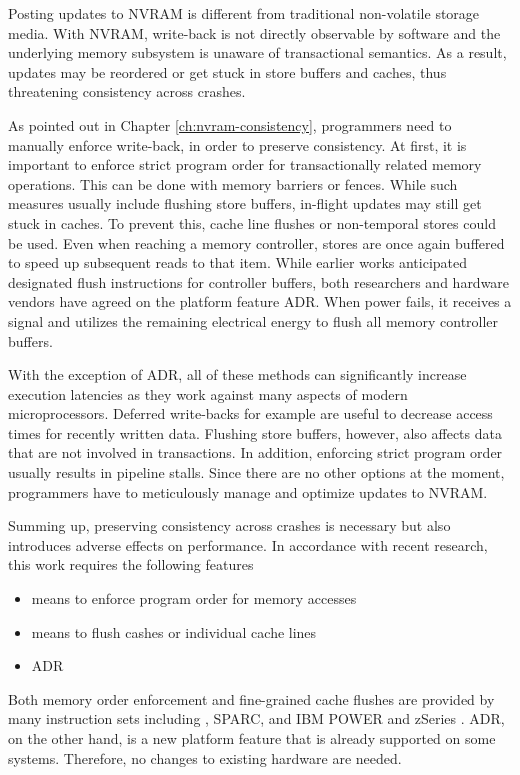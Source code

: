 Posting updates to NVRAM is different from traditional non-volatile storage
media. With NVRAM, write-back is not directly observable by software and the
underlying memory subsystem is unaware of transactional semantics. As a result,
updates may be reordered or get stuck in store buffers and caches, thus
threatening consistency across crashes.

As pointed out in Chapter \ref{ch:nvram-consistency}, programmers need to
manually enforce write-back, in order to preserve consistency. At first, it is
important to enforce strict program order for transactionally related memory
operations. This can be done with memory barriers or fences. While such measures
usually include flushing store buffers, in-flight updates may still get stuck in
caches. To prevent this, cache line flushes or non-temporal stores could be
used. Even when reaching a memory controller, stores are once again buffered to
speed up subsequent reads to that item. While earlier works anticipated
designated flush instructions for controller buffers, both researchers and
hardware vendors have agreed on the platform feature ADR. When power fails, it
receives a signal and utilizes the remaining electrical energy to flush all
memory controller buffers.

With the exception of ADR, all of these methods can significantly increase
execution latencies as they work against many aspects of modern microprocessors.
Deferred write-backs for example are useful to decrease access times for
recently written data. Flushing store buffers, however, also affects data that
are not involved in transactions. In addition, enforcing strict program order
usually results in pipeline stalls. Since there are no other options at the
moment, programmers have to meticulously manage and optimize updates to NVRAM.

Summing up, preserving consistency across crashes is necessary but also
introduces adverse effects on performance. In accordance with recent research,
this work requires the following features

\begin{itemize}
    \item means to enforce program order for memory accesses
    \item means to flush cashes or individual cache lines
    \item ADR
\end{itemize}

Both memory order enforcement and fine-grained cache flushes are provided by
many instruction sets including , SPARC, and IBM POWER and zSeries
\cite{mckenney2007memory}. ADR, on the other hand, is a new platform feature
that is already supported on some systems. Therefore, no changes to existing
hardware are needed.
